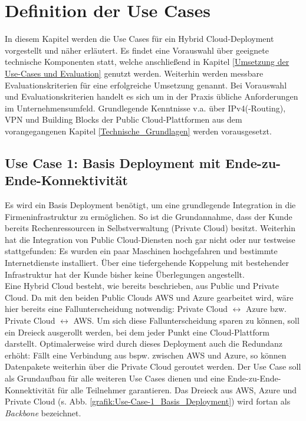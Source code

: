 \chapter{Definition der Use Cases} \label{Defintion der Use-Cases}
In diesem Kapitel werden die Use Cases für ein Hybrid Cloud-\gls{Deployment} vorgestellt und näher erläutert. Es findet eine Vorauswahl über geeignete technische Komponenten statt, welche anschließend in Kapitel \ref{Umsetzung der Use-Cases und Evaluation} genutzt werden. Weiterhin werden messbare Evaluationskriterien für eine erfolgreiche Umsetzung genannt. Bei Vorauswahl und Evaluationskriterien handelt es sich um in der Praxis übliche Anforderungen im Unternehmensumfeld. Grundlegende Kenntnisse v.a. über IPv4(-Routing), \gls{VPN} und Building Blocks der Public Cloud-Plattformen aus dem vorangegangenen Kapitel \ref{Technische_Grundlagen} werden vorausgesetzt.

\section{Use Case 1: Basis Deployment mit Ende-zu-Ende-Konnektivität}\label{base-deployment}
Es wird ein Basis \gls{Deployment} benötigt, um eine grundlegende Integration in die Firmeninfrastruktur zu ermöglichen. So ist die Grundannahme, dass der Kunde bereits Rechenressourcen in Selbstverwaltung (\glqq Private Cloud\grqq{}) besitzt. Weiterhin hat die Integration von Public Cloud-Diensten noch gar nicht oder nur testweise stattgefunden: Es wurden ein paar Maschinen hochgefahren und bestimmte Internetdienste installiert. Über eine tiefergehende Koppelung mit bestehender Infrastruktur hat der Kunde bisher keine Überlegungen angestellt.\\
Eine Hybrid Cloud besteht, wie bereits beschrieben, aus Public und Private Cloud. Da mit den beiden Public Clouds AWS und Azure gearbeitet wird, wäre hier bereits eine Fallunterscheidung notwendig: Private Cloud $\leftrightarrow$ Azure bzw. Private Cloud $\leftrightarrow$ AWS. Um sich diese Fallunterscheidung sparen zu können, soll ein Dreieck ausgerollt werden, bei dem jeder Punkt eine Cloud-Plattform darstellt.
Optimalerweise wird durch dieses \gls{Deployment} auch die Redundanz erhöht: Fällt eine Verbindung aus bspw. zwischen AWS und Azure, so können Datenpakete weiterhin über die Private Cloud geroutet werden.
Der Use Case soll als Grundaufbau für alle weiteren Use Cases dienen und eine Ende-zu-Ende-Konnektivität für alle Teilnehmer garantieren. Das Dreieck aus AWS, Azure und Private Cloud (s. Abb. \ref{grafik:Use-Case-1_Basis_Deployment}) wird fortan als \textit{\gls{Backbone}} bezeichnet.

